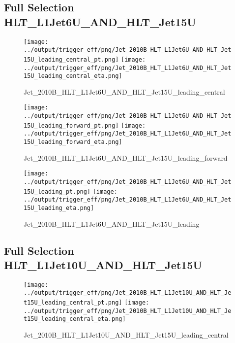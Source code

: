 \documentclass[11pt]{article}
\begin{document}
\newpage
\subsection{Full Selection HLT\_L1Jet6U\_AND\_HLT\_Jet15U}
\begin{figure}[ht]
\centering
\texttt{[image: ../output/trigger\_eff/png/Jet\_2010B\_HLT\_L1Jet6U\_AND\_HLT\_Jet15U\_leading\_central\_pt.png]}
\texttt{[image: ../output/trigger\_eff/png/Jet\_2010B\_HLT\_L1Jet6U\_AND\_HLT\_Jet15U\_leading\_central\_eta.png]}
\caption{Jet\_2010B\_HLT\_L1Jet6U\_AND\_HLT\_Jet15U\_leading\_central}
\label{fig:jet_L1Jet6U_AND_HLT_Jet15U_leading_central}
\end{figure}

\begin{figure}[ht]
\centering
\texttt{[image: ../output/trigger\_eff/png/Jet\_2010B\_HLT\_L1Jet6U\_AND\_HLT\_Jet15U\_leading\_forward\_pt.png]}
\texttt{[image: ../output/trigger\_eff/png/Jet\_2010B\_HLT\_L1Jet6U\_AND\_HLT\_Jet15U\_leading\_forward\_eta.png]}
\caption{Jet\_2010B\_HLT\_L1Jet6U\_AND\_HLT\_Jet15U\_leading\_forward}
\label{fig:jet_L1Jet6U_AND_HLT_Jet15U_leading_forward}
\end{figure}

\begin{figure}[ht]
\centering
\texttt{[image: ../output/trigger\_eff/png/Jet\_2010B\_HLT\_L1Jet6U\_AND\_HLT\_Jet15U\_leading\_pt.png]}
\texttt{[image: ../output/trigger\_eff/png/Jet\_2010B\_HLT\_L1Jet6U\_AND\_HLT\_Jet15U\_leading\_eta.png]}
\caption{Jet\_2010B\_HLT\_L1Jet6U\_AND\_HLT\_Jet15U\_leading}
\label{fig:jet_L1Jet6U_AND_HLT_Jet15U_leading}
\end{figure}

\newpage
\subsection{Full Selection HLT\_L1Jet10U\_AND\_HLT\_Jet15U}
\begin{figure}[ht]
\centering
\texttt{[image: ../output/trigger\_eff/png/Jet\_2010B\_HLT\_L1Jet10U\_AND\_HLT\_Jet15U\_leading\_central\_pt.png]}
\texttt{[image: ../output/trigger\_eff/png/Jet\_2010B\_HLT\_L1Jet10U\_AND\_HLT\_Jet15U\_leading\_central\_eta.png]}
\caption{Jet\_2010B\_HLT\_L1Jet10U\_AND\_HLT\_Jet15U\_leading\_central}
\label{fig:jet_L1Jet10U_AND_HLT_Jet15U_leading_central}
\end{figure}
\end{document}
